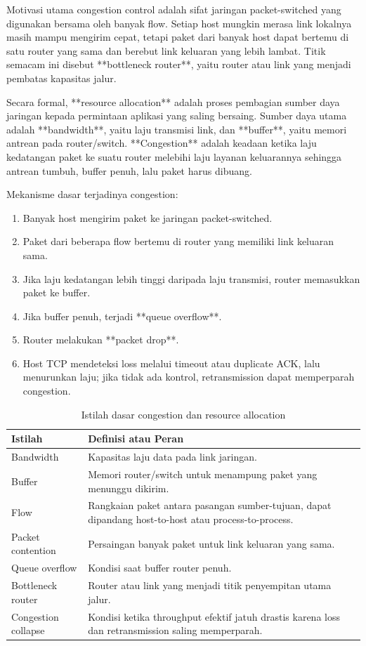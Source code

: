 Motivasi utama congestion control adalah sifat jaringan packet-switched yang digunakan bersama oleh banyak flow. Setiap host mungkin merasa link lokalnya masih mampu mengirim cepat, tetapi paket dari banyak host dapat bertemu di satu router yang sama dan berebut link keluaran yang lebih lambat. Titik semacam ini disebut **bottleneck router**, yaitu router atau link yang menjadi pembatas kapasitas jalur.

Secara formal, **resource allocation** adalah proses pembagian sumber daya jaringan kepada permintaan aplikasi yang saling bersaing. Sumber daya utama adalah **bandwidth**, yaitu laju transmisi link, dan **buffer**, yaitu memori antrean pada router/switch. **Congestion** adalah keadaan ketika laju kedatangan paket ke suatu router melebihi laju layanan keluarannya sehingga antrean tumbuh, buffer penuh, lalu paket harus dibuang.

Mekanisme dasar terjadinya congestion:
\begin{enumerate}
    \item Banyak host mengirim paket ke jaringan packet-switched.
    \item Paket dari beberapa flow bertemu di router yang memiliki link keluaran sama.
    \item Jika laju kedatangan lebih tinggi daripada laju transmisi, router memasukkan paket ke buffer.
    \item Jika buffer penuh, terjadi **queue overflow**.
    \item Router melakukan **packet drop**.
    \item Host TCP mendeteksi loss melalui timeout atau duplicate ACK, lalu menurunkan laju; jika tidak ada kontrol, retransmission dapat memperparah congestion.
\end{enumerate}

\begin{table}[H]
\centering
\begin{tabularx}{\textwidth}{|L{0.30\textwidth}|X|}
\hline
\textbf{Istilah} & \textbf{Definisi atau Peran} \\
\hline
Bandwidth & Kapasitas laju data pada link jaringan. \\
\hline
Buffer & Memori router/switch untuk menampung paket yang menunggu dikirim. \\
\hline
Flow & Rangkaian paket antara pasangan sumber-tujuan, dapat dipandang host-to-host atau process-to-process. \\
\hline
Packet contention & Persaingan banyak paket untuk link keluaran yang sama. \\
\hline
Queue overflow & Kondisi saat buffer router penuh. \\
\hline
Bottleneck router & Router atau link yang menjadi titik penyempitan utama jalur. \\
\hline
Congestion collapse & Kondisi ketika throughput efektif jatuh drastis karena loss dan retransmission saling memperparah. \\
\hline
\end{tabularx}
\caption{Istilah dasar congestion dan resource allocation}
\label{tab:congestion-basic-terms}
\end{table}

